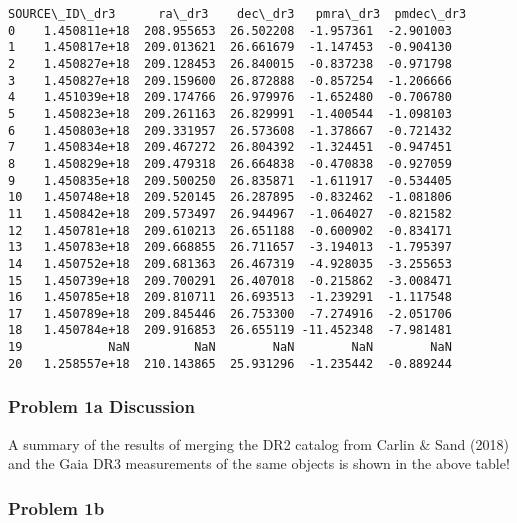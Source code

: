 \documentclass[11pt]{article}
\begin{document}
\begin{tcolorbox}[breakable, size=fbox, boxrule=.5pt, pad at break*=1mm, opacityfill=0]
\begin{Verbatim}[commandchars=\\\{\}]
    SOURCE\_ID\_dr3      ra\_dr3    dec\_dr3   pmra\_dr3  pmdec\_dr3
0    1.450811e+18  208.955653  26.502208  -1.957361  -2.901003
1    1.450817e+18  209.013621  26.661679  -1.147453  -0.904130
2    1.450827e+18  209.128453  26.840015  -0.837238  -0.971798
3    1.450827e+18  209.159600  26.872888  -0.857254  -1.206666
4    1.451039e+18  209.174766  26.979976  -1.652480  -0.706780
5    1.450823e+18  209.261163  26.829991  -1.400544  -1.098103
6    1.450803e+18  209.331957  26.573608  -1.378667  -0.721432
7    1.450834e+18  209.467272  26.804392  -1.324451  -0.947451
8    1.450829e+18  209.479318  26.664838  -0.470838  -0.927059
9    1.450835e+18  209.500250  26.835871  -1.611917  -0.534405
10   1.450748e+18  209.520145  26.287895  -0.832462  -1.081806
11   1.450842e+18  209.573497  26.944967  -1.064027  -0.821582
12   1.450781e+18  209.610213  26.651188  -0.600902  -0.834171
13   1.450783e+18  209.668855  26.711657  -3.194013  -1.795397
14   1.450752e+18  209.681363  26.467319  -4.928035  -3.255653
15   1.450739e+18  209.700291  26.407018  -0.215862  -3.008471
16   1.450785e+18  209.810711  26.693513  -1.239291  -1.117548
17   1.450789e+18  209.845446  26.753300  -7.274916  -2.051706
18   1.450784e+18  209.916853  26.655119 -11.452348  -7.981481
19            NaN         NaN        NaN        NaN        NaN
20   1.258557e+18  210.143865  25.931296  -1.235442  -0.889244
\end{Verbatim}
\end{tcolorbox}
        
    \subsubsection{Problem 1a Discussion}\label{problem-1a-discussion}

A summary of the results of merging the DR2 catalog from Carlin \& Sand
(2018) and the Gaia DR3 measurements of the same objects is shown in the
above table!

\subsubsection{Problem 1b}\label{problem-1b}
\end{document}
